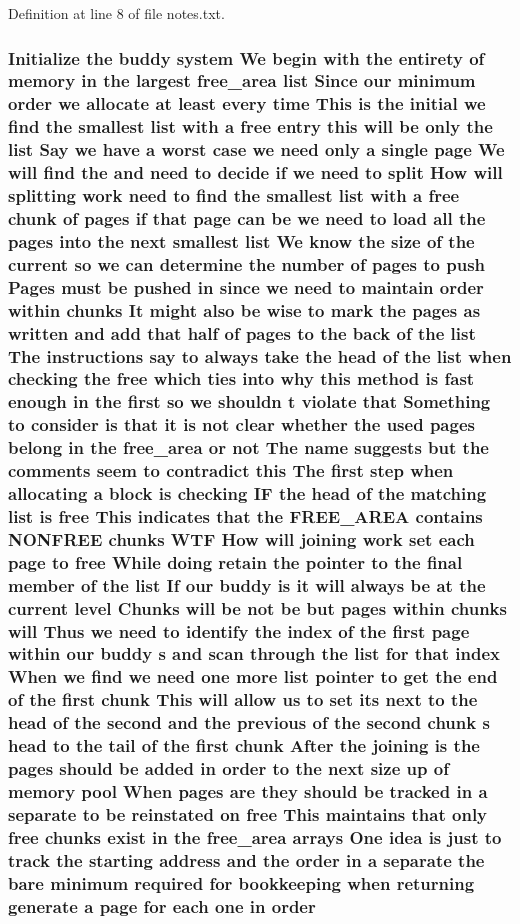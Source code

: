 Definition at line 8 of file notes.\+txt.

\subsubsection[{\texorpdfstring{order}{order}}]{\setlength{\rightskip}{0pt plus 5cm}Initialize the buddy system We begin with the entirety of memory {\bf in} the largest {\bf free\+\_\+area} {\bf list} Since our minimum order we allocate at least every time This {\bf is} the initial we find the smallest {\bf list} with a free entry this will be only the {\bf list} Say we have a worst case we need only a single {\bf page} We will find the and need to decide if we need to {\bf split} How will splitting work need to find the smallest {\bf list} with a free {\bf chunk} of {\bf pages} if that {\bf page} can be we need to load all the {\bf pages} into the next smallest {\bf list} We know the size of the current {\bf so} we can determine the number of {\bf pages} to push Pages must be pushed {\bf in} since we need to maintain order within chunks It might also be wise to mark the {\bf pages} as written and add that half of {\bf pages} to the back of the {\bf list} The instructions say to always take the head of the {\bf list} when checking the free which ties into why this method {\bf is} fast enough {\bf in} the {\bf first} {\bf so} we shouldn t violate that Something to consider {\bf is} that {\bf it} {\bf is} {\bf not} clear whether the used {\bf pages} belong {\bf in} the {\bf free\+\_\+area} or {\bf not} The name suggests but the comments seem to contradict this The {\bf first} step when allocating a block {\bf is} checking IF the head of the matching {\bf list} {\bf is} free This indicates that the F\+R\+E\+E\+\_\+\+A\+R\+EA contains N\+O\+N\+F\+R\+EE chunks W\+TF How will joining work set each {\bf page} to free While doing retain the pointer to the final member of the {\bf list} If our buddy {\bf is} {\bf it} will always be at the current level Chunks will be {\bf not} be but {\bf pages} within chunks will Thus we need to identify the index of the {\bf first} {\bf page} within our buddy s and scan through the {\bf list} for that index When we find we need one more {\bf list} pointer to get the end of the {\bf first} {\bf chunk} This will allow us to set its next to the head of the second and the previous of the second {\bf chunk} s head to the tail of the {\bf first} {\bf chunk} After the joining {\bf is} the {\bf pages} should be added {\bf in} order to the next size up of memory pool When {\bf pages} are they should be tracked {\bf in} a separate to be reinstated on free This maintains that only free chunks exist {\bf in} the {\bf free\+\_\+area} arrays One idea {\bf is} just to track the starting address and the order {\bf in} a separate the bare minimum required for bookkeeping when returning generate a {\bf page} for each one {\bf in} order}\hypertarget{notes_8txt_ae170b788b9ce36849b8a92724a029135}{}\label{notes_8txt_ae170b788b9ce36849b8a92724a029135}



